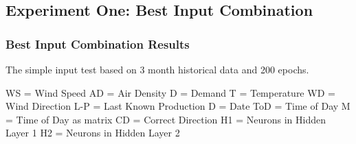 \subsection{Experiment One: Best Input Combination}

\subsubsection{Best Input Combination Results}
\label{sec:simpleInputTest}
The simple input test based on 3 month historical data and 200 epochs.

WS = Wind Speed
AD = Air Density
D = Demand
T = Temperature
WD = Wind Direction
L-P = Last Known Production
D = Date
ToD = Time of Day
M = Time of Day as matrix
CD = Correct Direction
H1 = Neurons in Hidden Layer 1
H2 = Neurons in Hidden Layer 2

